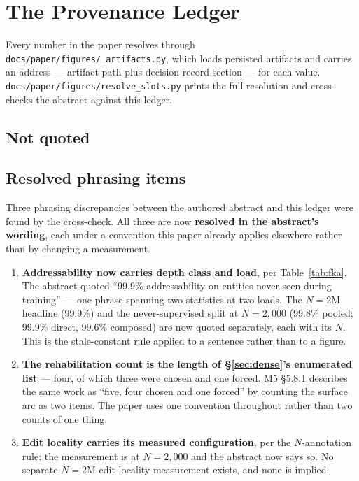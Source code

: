 \section{The Provenance Ledger}
\label{app:ledger}

\begin{table}[h]\centering\small
\caption{Headline numbers with their scope and record. Reproduced from M5 \S5.147.}

\end{table}

\noindent Every number in the paper resolves through
\texttt{docs/paper/figures/\_artifacts.py}, which loads persisted artifacts and carries an address
--- artifact path plus decision-record section --- for each value.
\texttt{docs/paper/figures/resolve\_slots.py} prints the full resolution and cross-checks the
abstract against this ledger.

\subsection*{Not quoted}

\begin{table}[h]\centering\small
\caption{What the record could be read to support, and which we decline to claim.}

\end{table}

\subsection*{Resolved phrasing items}

Three phrasing discrepancies between the authored abstract and this ledger were found by the
cross-check. All three are now \textbf{resolved in the abstract's wording}, each under a convention
this paper already applies elsewhere rather than by changing a measurement.

\begin{enumerate}
\item \textbf{Addressability now carries depth class and load}, per Table~\ref{tab:fka}. The
abstract quoted ``99.9\% addressability on entities never seen during training'' --- one phrase
spanning two statistics at two loads. The $N = 2$M headline (99.9\%) and the never-supervised split
at $N = 2{,}000$ (99.8\% pooled; 99.9\% direct, 99.6\% composed) are now quoted separately, each
with its $N$. This is the stale-constant rule applied to a sentence rather than to a figure.
\item \textbf{The rehabilitation count is the length of \S\ref{sec:dense}'s enumerated list} ---
four, of which three were chosen and one forced. M5 \S5.8.1 describes the same work as ``five, four
chosen and one forced'' by counting the surface arc as two items. The paper uses one convention
throughout rather than two counts of one thing.
\item \textbf{Edit locality carries its measured configuration}, per the $N$-annotation rule: the
measurement is at $N = 2{,}000$ and the abstract now says so. No separate $N = 2$M edit-locality
measurement exists, and none is implied.
\end{enumerate}
